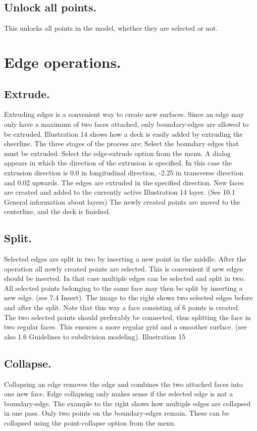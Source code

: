 \documentclass[12pt]{article}
\begin{document}
\subsection{Unlock all points.}
This unlocks all points in the model, whether they are selected or not.

\section{Edge operations.}

\subsection{Extrude.}
Extruding edges is a convenient way to create new surfaces.
Since an edge may only have a maximum of two faces
attached, only boundary-edges are allowed to be extruded.
Illustration 14 shows how a deck is easily added by extruding
the sheerline. The three stages of the process are:
Select the boundary edges that must be extruded.
Select the edge-extrude option from the menu. A
dialog appears in which the direction of the extrusion is
specified. In this case the extrusion direction is 0.0 in
longitudinal direction, -2.25 in transverse direction and
0.02 upwards.
The edges are extruded in the specified direction. New
faces are created and added to the currently active
 Illustration 14
layer. (See 10.1 General information about layers)
The newly created points are moved to the centerline, and the deck is finished.

\subsection{Split.}
Selected edges are split in two by inserting a new
point in the middle. After the operation all newly
created points are selected. This is convenient if new
edges should be inserted. In that case multiple edges
can be selected and split in two. All selected points
belonging to the same face may then be split by
inserting a new edge. (see 7.4 Insert). The image to
the right shows two selected edges before and after
the split. Note that this way a face consisting of 6
points is created. The two selected points should
preferably be connected, thus splitting the face in two
regular faces. This ensures a more regular grid and a
smoother surface. (see also 1.6 Guidelines to
subdivision modeling).
Illustration 15

\subsection{Collapse.}
Collapsing an edge removes the edge and combines the two attached faces into one new face.
Edge collapsing only makes sense if the selected edge is not a boundary-edge. The example to the
right shows how multiple edges are collapsed in one pass. Only two points on the boundary-edges
remain. These can be collapsed using the point-collapse option from the menu.
\end{document}
